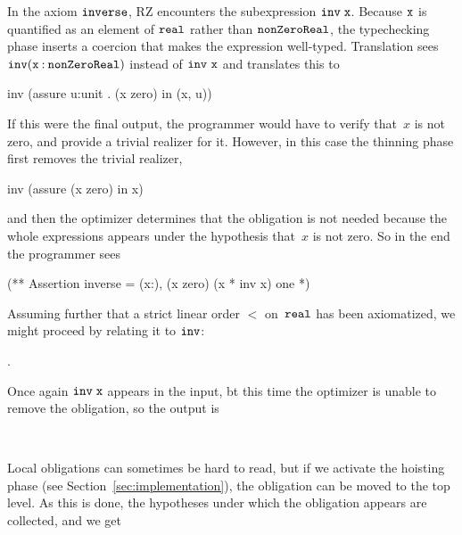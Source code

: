 In the axiom $\mathtt{inverse}$, RZ encounters the subexpression
$\mathtt{inv \;x}$. Because $\mathtt{x}$ is quantified as an element of
$\mathtt{real}$ rather than $\mathtt{nonZeroReal}$, the typechecking
phase inserts a coercion that makes the expression well-typed.
Translation sees $\mathtt{inv}(\mathtt{x} \mathbin{{:}}
\mathtt{nonZeroReal})$ instead of $\f{inv\ x}$ and translates this to
%
\begin{source}
inv (assure u:unit . \iNot (x  zero) in (x, u))
\end{source}
%
If this were the final output, the programmer would have to verify
that~$x$ is not zero, and provide a trivial realizer for it. However,
in this case the thinning phase first removes the trivial realizer,
%
\iflong
\begin{source}
inv (assure \iNot (x  zero) in x)
\end{source}%
\fi %
%
and then the optimizer determines that the obligation is not needed
because the whole expressions appears under the hypothesis that~$x$ is
not zero. So in the end the programmer sees
%
\begin{source}
(**  Assertion inverse =
  \iForall (x:),  \iNot (x  zero) \iTo (x * inv x)  one
*)
\end{source}
%
Assuming further that a strict linear order $<$ on~$\mathtt{real}$ has
been axiomatized, we might proceed by relating it to $\mathtt{inv}$:
%
\begin{showInput}
.
\end{showInput}%
%
Once again $\mathtt{inv\;x}$ appears in the input, bt this time the
optimizer is unable to remove the obligation, so the output is
%
\begin{showOutput}
\\
\qquad
{}
\end{showOutput}
%
Local obligations can sometimes be hard to read, but if we activate the hoisting phase
(see Section~\ref{sec:implementation}), the obligation can be moved
to the top level. As this is done, the hypotheses under which the
obligation appears are collected, and we get
